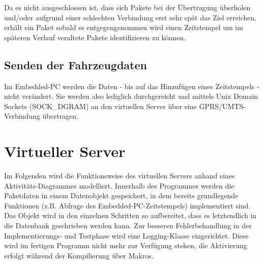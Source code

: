 \documentclass[fontsize = 12pt, paper = a4]{scrreprt}
\begin{document}
Da es nicht ausgeschlossen ist, dass sich Pakete bei der Übertragung überholen und/oder aufgrund einer schlechten Verbindung erst sehr spät das Ziel erreichen, erhält ein Paket sobald es entgegengenommen wird einen Zeitstempel um im späteren Verlauf veraltete Pakete identifizieren zu können. 

\subsection{Senden der Fahrzeugdaten}

Im Embedded-PC werden die Daten - bis auf das Hinzufügen eines Zeitstempels - nicht verändert. Sie werden also lediglich durchgereicht und mittels Unix Domain Sockets (SOCK\_DGRAM) an den virtuellen Server über eine GPRS/UMTS-Verbindung übertragen. 

\section{Virtueller Server}

Im Folgenden wird die Funktionsweise des virtuellen Servers anhand eines Aktivitäts-Diagrammes modelliert. Innerhalb des Programmes werden die Paketdaten in einem Datenobjekt gespeichert, in dem bereits grundlegende Funktionen (z.B. Abfrage des Embedded-PC-Zeitstempels) implementiert sind. Das Objekt wird in den einzelnen Schritten so aufbereitet, dass es letztendlich in die Datenbank geschrieben werden kann. Zur besseren Fehlerbehandlung in der Implementierungs- und Testphase wird eine Logging-Klasse eingerichtet. Diese wird im fertigen Programm nicht mehr zur Verfügung stehen, die Aktivierung erfolgt während der Kompilierung über Makros. \\
\end{document}
